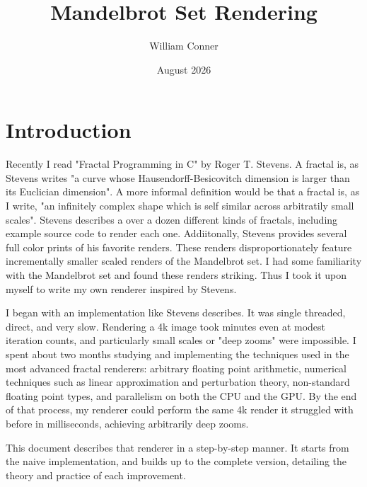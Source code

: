 \documentclass{article}
\title{Mandelbrot Set Rendering}
\author{William Conner}
\date{August 2026}
\begin{document}
\maketitle

\section{Introduction}
\par Recently I read "Fractal Programming in C" by Roger T. Stevens\cite{Stevens_1989}. A fractal is, as Stevens writes "a curve whose Hausendorff-Besicovitch dimension is larger than its Euclician dimension". A more informal definition would be that a fractal is, as I write, "an infinitely complex shape which is self similar across arbitratily small scales". Stevens describes a over a dozen different kinds of fractals, including example source code to render each one. Addiitonally, Stevens provides several full color prints of his favorite renders. These renders disproportionately feature incrementally smaller scaled renders of the Mandelbrot set. I had some familiarity with the Mandelbrot set and found these renders striking. Thus I took it upon myself to write my own renderer inspired by Stevens.
\par I began with an implementation like Stevens describes. It was single threaded, direct, and very slow. Rendering a 4k image took minutes even at modest iteration counts, and particularly small scales or "deep zooms" were impossible. I spent about two months studying and implementing the techniques used in the most advanced fractal renderers: arbitrary floating point arithmetic, numerical techniques such as linear approximation and perturbation theory, non-standard floating point types, and parallelism on both the CPU and the GPU. By the end of that process, my renderer could perform the same 4k render it struggled with before in milliseconds, achieving arbitrarily deep zooms.
\par This document describes that renderer in a step-by-step manner. It starts from the naive implementation, and builds up to the complete version, detailing the theory and practice of each improvement.
\end{document}
